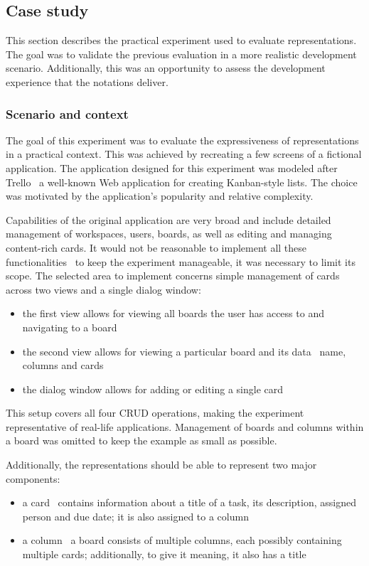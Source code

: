 \subsection{Case study}\label{subsec:case-study}
This section describes the practical experiment used to evaluate representations.
The goal was to validate the previous evaluation in a more realistic development scenario.
Additionally, this was an opportunity to assess the development experience that the notations deliver.

\subsubsection{Scenario and context}
The goal of this experiment was to evaluate the expressiveness of representations in a practical context.
This was achieved by recreating a few screens of a fictional application.
The application designed for this experiment was modeled after Trello \textendash\ a well-known Web application for creating Kanban-style lists.
The choice was motivated by the application's popularity and relative complexity.

Capabilities of the original application are very broad and include detailed management of workspaces, users, boards, as well as editing and managing content-rich cards.
It would not be reasonable to implement all these functionalities \textendash\ to keep the experiment manageable, it was necessary to limit its scope.
The selected area to implement concerns simple management of cards across two views and a single dialog window:
\begin{itemize}
    \item the first view allows for viewing all boards the user has access to and navigating to a board
    \item the second view allows for viewing a particular board and its data \textendash\ name, columns and cards
    \item the dialog window allows for adding or editing a single card
\end{itemize}
This setup covers all four CRUD operations, making the experiment representative of real-life applications.
Management of boards and columns within a board was omitted to keep the example as small as possible.

Additionally, the representations should be able to represent two major components:
\begin{itemize}
    \item a card \textendash\ contains information about a title of a task, its description, assigned person and due date; it is also assigned to a column
    \item a column \textendash\ a board consists of multiple columns, each possibly containing multiple cards; additionally, to give it meaning, it also has a title
\end{itemize}

